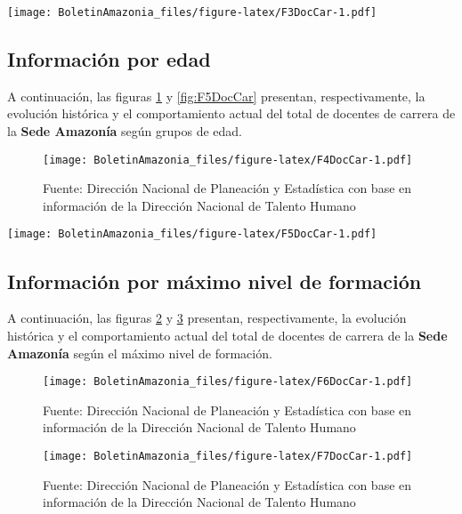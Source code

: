 \documentclass[
]{book}
\begin{document}
\texttt{[image: BoletinAmazonia\_files/figure-latex/F3DocCar-1.pdf]}

\hypertarget{informaciuxf3n-por-edad-10}{%
\subsection{Información por edad}\label{informaciuxf3n-por-edad-10}}

A continuación, las figuras \ref{fig:F4DocCar} y \ref{fig:F5DocCar} presentan, respectivamente, la evolución histórica y el comportamiento actual del total de docentes de carrera de la \textbf{Sede Amazonía} según grupos de edad.

\begin{figure}
\centering
\texttt{[image: BoletinAmazonia\_files/figure-latex/F4DocCar-1.pdf]}
\caption{\label{fig:F4DocCar}Fuente: Dirección Nacional de Planeación y Estadística con base en información de la Dirección Nacional de Talento Humano}
\end{figure}

\texttt{[image: BoletinAmazonia\_files/figure-latex/F5DocCar-1.pdf]}

\hypertarget{informaciuxf3n-por-muxe1ximo-nivel-de-formaciuxf3n}{%
\subsection{Información por máximo nivel de formación}\label{informaciuxf3n-por-muxe1ximo-nivel-de-formaciuxf3n}}

A continuación, las figuras \ref{fig:F6DocCar} y \ref{fig:F7DocCar} presentan, respectivamente, la evolución histórica y el comportamiento actual del total de docentes de carrera de la \textbf{Sede Amazonía} según el máximo nivel de formación.

\begin{figure}
\centering
\texttt{[image: BoletinAmazonia\_files/figure-latex/F6DocCar-1.pdf]}
\caption{\label{fig:F6DocCar}Fuente: Dirección Nacional de Planeación y Estadística con base en información de la Dirección Nacional de Talento Humano}
\end{figure}

\begin{figure}
\centering
\texttt{[image: BoletinAmazonia\_files/figure-latex/F7DocCar-1.pdf]}
\caption{\label{fig:F7DocCar}Fuente: Dirección Nacional de Planeación y Estadística con base en información de la Dirección Nacional de Talento Humano}
\end{figure}
\end{document}

